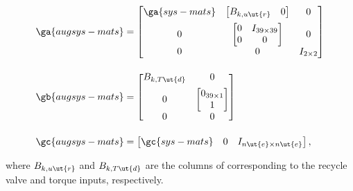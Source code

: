 \begin{equation}
  \begin{split}
    \ga{augsys-mats} & =
    \begin{bmatrix}
      \ga{sys-mats} & \begin{bmatrix} B_{k,u\ut{r}} & 0 \end{bmatrix} & 0\\[0.5em]
      0 & \begin{bmatrix} 0 & I_{39\times 39}\\ 0 & 0\end{bmatrix} & 0\\[0.5em]
      0 & 0 & I_{2\times 2}
    \end{bmatrix}\\[1em]
%
    \gb{augsys-mats} & = 
    \begin{bmatrix}
      B_{k,T\ut{d}} & 0\\[0.5em]
      0 & \begin{bmatrix} 0_{39\times 1}\\ 1 \end{bmatrix} \\[0.5em]
      0 & 0
    \end{bmatrix}\\[1em]
%
    \gc{augsys-mats} & = \begin{bmatrix}
      \gc{sys-mats} & 0 & I_{n\ut{e} \times n\ut{e}}
    \end{bmatrix},
  \end{split}
\end{equation}

where $B_{k,u\ut{r}}$ and $B_{k,T\ut{d}}$ are the columns of  corresponding to the recycle valve and torque inputs, respectively.

